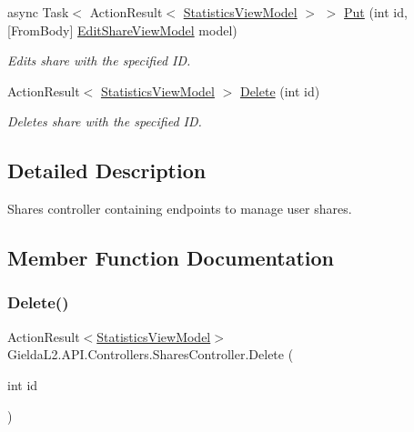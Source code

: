 \begin{DoxyCompactItemize}
async Task$<$ Action\+Result$<$ \mbox{\hyperlink{class_gielda_l2_1_1_a_p_i_1_1_view_models_1_1_view_1_1_statistics_view_model}{Statistics\+View\+Model}} $>$ $>$ \mbox{\hyperlink{class_gielda_l2_1_1_a_p_i_1_1_controllers_1_1_shares_controller_ab150a6062bfd1d10cb271cdfe0000901}{Put}} (int id, \mbox{[}From\+Body\mbox{]} \mbox{\hyperlink{class_gielda_l2_1_1_a_p_i_1_1_view_models_1_1_edit_1_1_edit_share_view_model}{Edit\+Share\+View\+Model}} model)
\begin{DoxyCompactList}\small\item\em Edits share with the specified ID. \end{DoxyCompactList}\item 
Action\+Result$<$ \mbox{\hyperlink{class_gielda_l2_1_1_a_p_i_1_1_view_models_1_1_view_1_1_statistics_view_model}{Statistics\+View\+Model}} $>$ \mbox{\hyperlink{class_gielda_l2_1_1_a_p_i_1_1_controllers_1_1_shares_controller_ad322516136277b4893790a697442ac72}{Delete}} (int id)
\begin{DoxyCompactList}\small\item\em Deletes share with the specified ID. \end{DoxyCompactList}\end{DoxyCompactItemize}


\subsection{Detailed Description}
Shares controller containing endpoints to manage user shares. 



\subsection{Member Function Documentation}
\mbox{\label{class_gielda_l2_1_1_a_p_i_1_1_controllers_1_1_shares_controller_ad322516136277b4893790a697442ac72}} 
\subsubsection{\texorpdfstring{Delete()}{Delete()}}
{\footnotesize\ttfamily Action\+Result$<$\mbox{\hyperlink{class_gielda_l2_1_1_a_p_i_1_1_view_models_1_1_view_1_1_statistics_view_model}{Statistics\+View\+Model}}$>$ Gielda\+L2.\+A\+P\+I.\+Controllers.\+Shares\+Controller.\+Delete (\begin{DoxyParamCaption}\item[{int}]{id }\end{DoxyParamCaption})}



